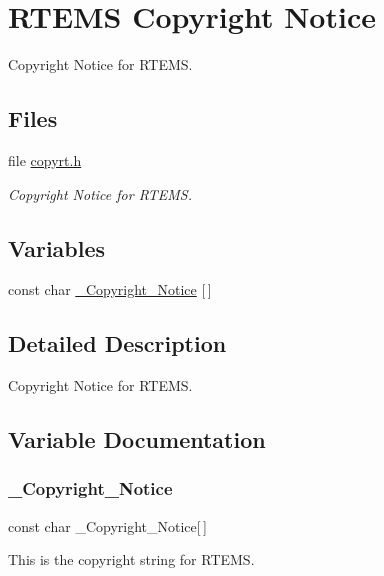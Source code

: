 \hypertarget{group__RTEMSSuperCoreCopyright}{}\section{R\+T\+E\+MS Copyright Notice}
\label{group__RTEMSSuperCoreCopyright}


Copyright Notice for R\+T\+E\+MS.  


\subsection*{Files}
\begin{DoxyCompactItemize}
\item 
file \mbox{\hyperlink{copyrt_8h}{copyrt.\+h}}
\begin{DoxyCompactList}\small\item\em Copyright Notice for R\+T\+E\+MS. \end{DoxyCompactList}\end{DoxyCompactItemize}
\subsection*{Variables}
\begin{DoxyCompactItemize}
\item 
const char \mbox{\hyperlink{group__RTEMSSuperCoreCopyright_gad310d144d45d11f4da872fb4a50300e1}{\+\_\+\+Copyright\+\_\+\+Notice}} \mbox{[}$\,$\mbox{]}
\end{DoxyCompactItemize}


\subsection{Detailed Description}
Copyright Notice for R\+T\+E\+MS. 



\subsection{Variable Documentation}
\mbox{\label{group__RTEMSSuperCoreCopyright_gad310d144d45d11f4da872fb4a50300e1}} 
\subsubsection{\texorpdfstring{\_Copyright\_Notice}{\_Copyright\_Notice}}
{\footnotesize\ttfamily const char \+\_\+\+Copyright\+\_\+\+Notice\mbox{[}$\,$\mbox{]}}

This is the copyright string for R\+T\+E\+MS. 